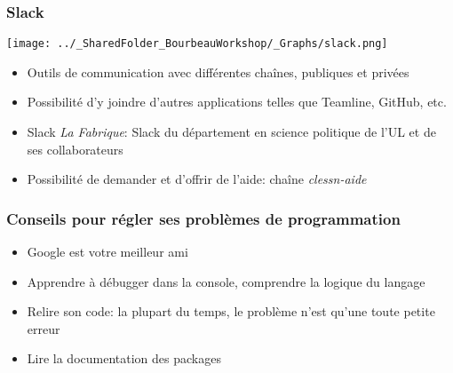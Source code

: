 \documentclass{beamer}
\begin{document}
\begin{frame}

  \frametitle{Slack} \vspace{1cm}
  
    \begin{center}
      
    \texttt{[image: ../\_SharedFolder\_BourbeauWorkshop/\_Graphs/slack.png]}

     \end{center}
      
    \begin{itemize}
     \item Outils de communication avec différentes chaînes, publiques et privées
     \item Possibilité d'y joindre d'autres applications telles que Teamline, GitHub, etc.
     \item Slack \textit{La Fabrique}: Slack du département en science politique de l'UL et de ses collaborateurs
     \item Possibilité de demander et d'offrir de l'aide: chaîne \textit{clessn-aide}
    
        
    \end{itemize}
      
\end{frame}


\begin{frame}

  \frametitle{Conseils pour régler ses problèmes de programmation} \vspace{1cm}

    \begin{itemize}
    
     \item Google est votre meilleur ami
     \item Apprendre à débugger dans la console, comprendre la logique du langage
     \item Relire son code: la plupart du temps, le problème n'est qu'une toute petite erreur
     \item Lire la documentation des packages 
    
    \end{itemize} 
    
  \end{frame}  
  
\end{document}
